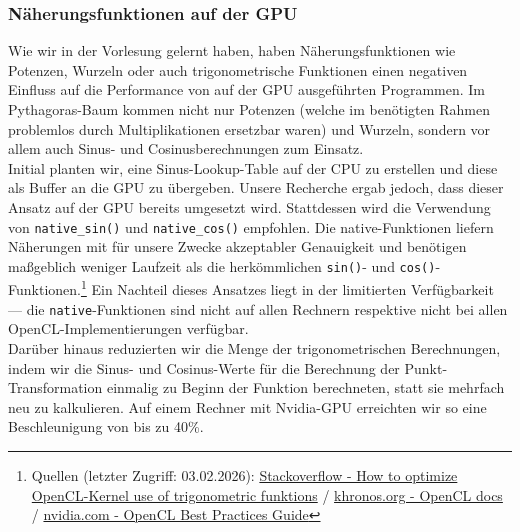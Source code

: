\subsubsection*{Näherungsfunktionen auf der GPU}
\vspace{-0.25cm}
Wie wir in der Vorlesung gelernt haben, haben Näherungsfunktionen wie Potenzen, Wurzeln oder auch trigonometrische Funktionen einen
negativen Einfluss auf die Performance von auf der GPU ausgeführten Programmen. Im Pythagoras-Baum kommen nicht nur Potenzen (welche
im benötigten Rahmen problemlos durch Multiplikationen ersetzbar waren) und Wurzeln, sondern vor allem auch Sinus- und Cosinusberechnungen 
zum Einsatz.\\
Initial planten wir, eine Sinus-Lookup-Table auf der CPU zu erstellen und diese als Buffer an die GPU zu übergeben. Unsere Recherche ergab
jedoch, dass dieser Ansatz auf der GPU bereits umgesetzt wird. Stattdessen wird die Verwendung von \texttt{native\_sin()} und
\texttt{native\_cos()} empfohlen. Die \glqq native\grqq-Funktionen liefern Näherungen mit für unsere Zwecke akzeptabler Genauigkeit und benötigen
maßgeblich weniger Laufzeit als die herkömmlichen \texttt{sin()}- und \texttt{cos()}-Funktionen.\footnote{Quellen (letzter Zugriff: 03.02.2026): 
\href{https://stackoverflow.com/questions/62546207/how-to-optimize-opencl-kernel-use-of-trigonometric-functions}{Stackoverflow - How to optimize OpenCL-Kernel use of trigonometric funktions} /
\href{https://registry.khronos.org/OpenCL/sdk/3.0/docs/man/html/erf.html}{khronos.org - OpenCL docs} /
\href{https://developer.download.nvidia.com/compute/DevZone/docs/html/OpenCL/doc/OpenCL_Best_Practices_Guide.pdf}{nvidia.com - OpenCL Best Practices Guide}}
Ein Nachteil dieses Ansatzes liegt in der limitierten Verfügbarkeit --- die \texttt{native}-Funktionen sind nicht auf allen
Rechnern respektive nicht bei allen OpenCL-Implementierungen verfügbar.\\
Darüber hinaus reduzierten wir die Menge der trigonometrischen Berechnungen, indem wir die Sinus- und Cosinus-Werte
für die Berechnung der Punkt-Transformation einmalig zu Beginn der Funktion berechneten, statt sie mehrfach neu zu kalkulieren. 
Auf einem Rechner mit Nvidia-GPU erreichten wir so eine Beschleunigung von bis zu 40\%. 


